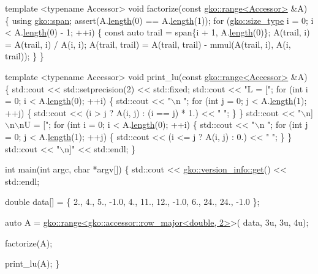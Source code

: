 \begin{DoxyCodeInclude}
\textcolor{keyword}{template} <\textcolor{keyword}{typename} Accessor>
\textcolor{keywordtype}{void} factorize(\textcolor{keyword}{const} \hyperlink{classgko_1_1range}{gko::range<Accessor>} &A)
\{
    \textcolor{keyword}{using} \hyperlink{structgko_1_1span}{gko::span};
    assert(A.\hyperlink{classgko_1_1range_a3ac8b238c377da9cc05d7c728efabfc8}{length}(0) == A.\hyperlink{classgko_1_1range_a3ac8b238c377da9cc05d7c728efabfc8}{length}(1));
    \textcolor{keywordflow}{for} (\hyperlink{namespacegko_a6e5c95df0ae4e47aab2f604a22d98ee7}{gko::size\_type} i = 0; i < A.\hyperlink{classgko_1_1range_a3ac8b238c377da9cc05d7c728efabfc8}{length}(0) - 1; ++i) \{
        \textcolor{keyword}{const} \textcolor{keyword}{auto} trail = span\{i + 1, A.\hyperlink{classgko_1_1range_a3ac8b238c377da9cc05d7c728efabfc8}{length}(0)\};
        A(trail, i) = A(trail, i) / A(i, i);
        A(trail, trail) = A(trail, trail) - mmul(A(trail, i), A(i, trail));
    \}
\}


\textcolor{keyword}{template} <\textcolor{keyword}{typename} Accessor>
\textcolor{keywordtype}{void} print\_lu(\textcolor{keyword}{const} \hyperlink{classgko_1_1range}{gko::range<Accessor>} &A)
\{
    std::cout << std::setprecision(2) << std::fixed;
    std::cout << \textcolor{stringliteral}{"L = ["};
    \textcolor{keywordflow}{for} (\textcolor{keywordtype}{int} i = 0; i < A.\hyperlink{classgko_1_1range_a3ac8b238c377da9cc05d7c728efabfc8}{length}(0); ++i) \{
        std::cout << \textcolor{stringliteral}{"\(\backslash\)n  "};
        \textcolor{keywordflow}{for} (\textcolor{keywordtype}{int} j = 0; j < A.\hyperlink{classgko_1_1range_a3ac8b238c377da9cc05d7c728efabfc8}{length}(1); ++j) \{
            std::cout << (i > j ? A(i, j) : (i == j) * 1.) << \textcolor{stringliteral}{" "};
        \}
    \}
    std::cout << \textcolor{stringliteral}{"\(\backslash\)n]\(\backslash\)n\(\backslash\)nU = ["};
    \textcolor{keywordflow}{for} (\textcolor{keywordtype}{int} i = 0; i < A.\hyperlink{classgko_1_1range_a3ac8b238c377da9cc05d7c728efabfc8}{length}(0); ++i) \{
        std::cout << \textcolor{stringliteral}{"\(\backslash\)n  "};
        \textcolor{keywordflow}{for} (\textcolor{keywordtype}{int} j = 0; j < A.\hyperlink{classgko_1_1range_a3ac8b238c377da9cc05d7c728efabfc8}{length}(1); ++j) \{
            std::cout << (i <= j ? A(i, j) : 0.) << \textcolor{stringliteral}{" "};
        \}
    \}
    std::cout << \textcolor{stringliteral}{"\(\backslash\)n]"} << std::endl;
\}


\textcolor{keywordtype}{int} main(\textcolor{keywordtype}{int} argc, \textcolor{keywordtype}{char} *argv[])
\{
    std::cout << \hyperlink{classgko_1_1version__info_a6daeb8a087cfb57fa055526fc133d8eb}{gko::version\_info::get}() << std::endl;

    \textcolor{keywordtype}{double} data[] = \{
        2.,  4.,  5., -1.0,
        4., 11., 12., -1.0,
        6., 24., 24., -1.0
    \};

    \textcolor{keyword}{auto} A = \hyperlink{classgko_1_1range}{gko::range<gko::accessor::row\_major<double, 2>}>(
      data, 3u, 3u, 4u);

    factorize(A);

    print\_lu(A);
\}
\end{DoxyCodeInclude}
 